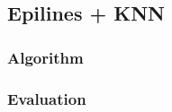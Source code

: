 \subsection{Epilines + KNN}
\label{sec:match:epi-knn}

\subsubsection{Algorithm}

\subsubsection{Evaluation}
